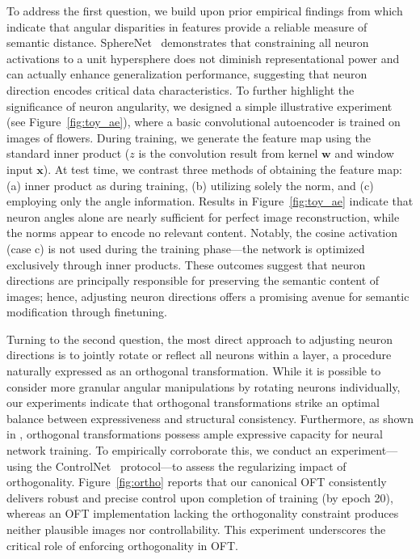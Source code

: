 To address the first question, we build upon prior empirical findings from \cite{liu2018decoupled,chen2020angular} which indicate that angular disparities in features provide a reliable measure of semantic distance. SphereNet~\cite{liu2017deep} demonstrates that constraining all neuron activations to a unit hypersphere does not diminish representational power and can actually enhance generalization performance, suggesting that neuron direction encodes critical data characteristics. To further highlight the significance of neuron angularity, we designed a simple illustrative experiment (see Figure~\ref{fig:toy_ae}), where a basic convolutional autoencoder is trained on images of flowers. During training, we generate the feature map using the standard inner product ($z$ is the convolution result from kernel $\bm{w}$ and window input $\bm{x}$). At test time, we contrast three methods of obtaining the feature map: (a) inner product as during training, (b) utilizing solely the norm, and (c) employing only the angle information. Results in Figure~\ref{fig:toy_ae} indicate that neuron angles alone are nearly sufficient for perfect image reconstruction, while the norms appear to encode no relevant content. Notably, the cosine activation (case c) is not used during the training phase—the network is optimized exclusively through inner products. These outcomes suggest that neuron directions are principally responsible for preserving the semantic content of images; hence, adjusting neuron directions offers a promising avenue for semantic modification through finetuning.

Turning to the second question, the most direct approach to adjusting neuron directions is to jointly rotate or reflect all neurons within a layer, a procedure naturally expressed as an orthogonal transformation. While it is possible to consider more granular angular manipulations by rotating neurons individually, our experiments indicate that orthogonal transformations strike an optimal balance between expressiveness and structural consistency. Furthermore, as shown in \cite{liu2021orthogonal}, orthogonal transformations possess ample expressive capacity for neural network training. To empirically corroborate this, we conduct an experiment—using the ControlNet~\cite{zhang2023adding} protocol—to assess the regularizing impact of orthogonality. Figure~\ref{fig:ortho} reports that our canonical OFT consistently delivers robust and precise control upon completion of training (by epoch 20), whereas an OFT implementation lacking the orthogonality constraint produces neither plausible images nor controllability. This experiment underscores the critical role of enforcing orthogonality in OFT.

